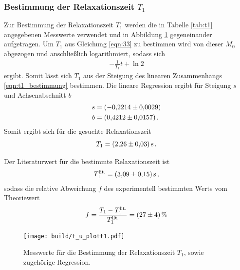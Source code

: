 \subsubsection{Bestimmung der Relaxationszeit $T_{1}$}
\label{subsubsec:T1}
Zur Bestimmung der Relaxationszeit $T_{1}$ werden die in Tabelle \ref{tab:t1} angegebenen
Messwerte verwendet und in Abbildung \ref{fig:T_1bestimmung} gegeneinander aufgetragen. Um $T_{1}$ aus Gleichung \eqref{eqn:33} zu bestimmen wird von dieser $M_{0}$ abgezogen und anschließlich logarithmiert, sodass sich
\begin{align}
  \label{eqn:t1_bestimmung}
  -\frac{1}{T_{1}} t + \ln 2
\end{align}
ergibt.
Somit lässt sich $T_{1}$ aus der Steigung des linearen Zusammenhangs \eqref{eqn:t1_bestimmung} bestimmen.
Die lineare Regression ergibt für Steigung $s$ und Achsenabschnitt $b$
\begin{align*}
  s &= \SI{-0.2214+-0.0029}{}\\
  b &= \SI{0.4212+-0.0157}{} \, .
\end{align*}
Somit ergibt sich für die gesuchte Relaxationszeit
\begin{align*}
  T_{1} = \SI{2.26+-0.03}{\second} \, .
\end{align*}


Der Literaturwert\cite{litwerte} für die bestimmte Relaxationszeit ist
\begin{align*}
  T_{1}^\text{lit.} = \SI{3.09+-0.15}{\second} \, ,
\end{align*}
sodass die relative Abweichung $f$ des experimentell bestimmten Werts
vom Theoriewert
\begin{align*}
  f = \frac{T_{1} - T_{1}^\text{lit.}}{T_{1}^\text{lit.}} = \SI{27+-4}{\percent}
\end{align*}


\begin{figure}[hhh]
  \centering
  \texttt{[image: build/t\_u\_plott1.pdf]}
  \caption{Messwerte für die Bestimmung der Relaxationszeit $T_{1}$, sowie zugehörige Regression.}
  \label{fig:T_1bestimmung}
\end{figure}


